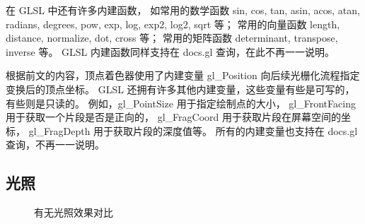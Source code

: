 \documentclass[fontset=windows]{ctexart}
\begin{document}
在 GLSL 中还有许多内建函数，
如常用的数学函数 sin, cos, tan, asin, acos, atan, radians, degrees, pow, exp, log, exp2, log2, sqrt 等；
常用的向量函数 length, distance, normalize, dot, cross 等；
常用的矩阵函数 determinant, transpose, inverse 等。
GLSL 内建函数同样支持在 docs.gl 查询，在此不再一一说明。

根据前文的内容，顶点着色器使用了内建变量 gl\_Position 向后续光栅化流程指定变换后的顶点坐标。
GLSL 还拥有许多其他内建变量，这些变量有些是可写的，有些则是只读的。
例如，gl\_PointSize 用于指定绘制点的大小，
gl\_FrontFacing 用于获取一个片段是否是正向的，
gl\_FragCoord 用于获取片段在屏幕空间的坐标，
gl\_FragDepth 用于获取片段的深度值等。
所有的内建变量也支持在 docs.gl 查询，不再一一说明。

\subsection{光照}

\begin{figure}[htbp]
    \centering
    \caption{有无光照效果对比}
    \label{fig-gl:lighting-compare}
\end{figure}
\end{document}
